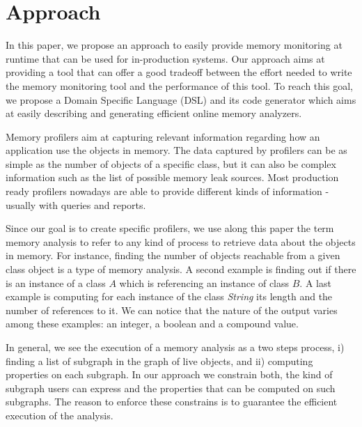\section{Approach}\label{sec:approach}

In this paper, we propose an approach to easily provide memory monitoring at runtime that can be used for in-production systems. 
Our approach aims at providing a tool that can offer a good tradeoff between the effort needed to write the memory monitoring tool and the performance of this tool.
To reach this goal, we propose a Domain Specific Language (DSL) and its code generator which aims at easily describing and generating efficient online memory analyzers. 


Memory profilers aim at capturing relevant information regarding how an application use the objects in memory.
The data captured by profilers can be as simple as the number of objects of a specific class, but it can also be complex information such as the list of possible memory leak sources.
Most production ready profilers nowadays are able to provide different kinds of information - usually with queries and reports.


Since our goal is to create specific profilers, we use along this paper the term memory analysis to refer to any kind of process to retrieve data about the objects in memory.
For instance, finding the number of objects reachable from a given class object is a type of memory analysis.
A second example is finding out if there is an instance of a class $A$ which is referencing an instance of class $B$.
A last example is computing for each instance of the class \textit{String} its length and the number of references to it.
We can notice that the nature of the output varies among these examples: an integer, a boolean and a compound value.

In general, we see the execution of a memory analysis as a two steps process, i) finding a list of subgraph in the graph of live objects, and ii) computing properties on each subgraph.
In our approach we constrain both, the kind of subgraph users can express and the properties that can be computed on such subgraphs.
The reason to enforce these constrains is to guarantee the efficient execution of the analysis. 

